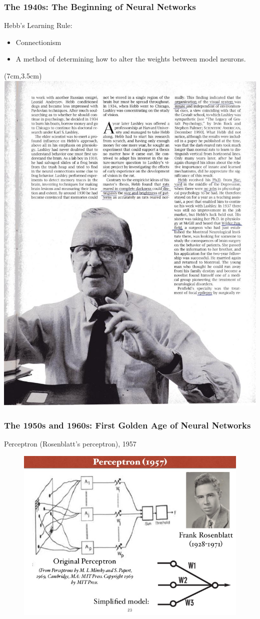 \documentclass{beamer}
\begin{document}
\begin{frame}
	\frametitle{The 1940s: The Beginning of Neural Networks}
	Hebb’s Learning Rule:
	\begin{itemize}
		\item  Connectionism
		\item  A method of determining how to alter the weights between model neurons.
	\end{itemize}
	\vspace{2in}
	\begin{textblock*}{0.65\linewidth}(7cm,3.5cm) %
		\includegraphics[width=0.65\linewidth]{image315}
	\end{textblock*}

\end{frame}


\begin{frame}
	\frametitle{The 1950s and 1960s: First Golden Age of Neural Networks}
	Perceptron (Rosenblatt’s perceptron), 1957
\begin{figure}
	\includegraphics[width=0.75\linewidth]{perceptron-2}
\end{figure}
\end{frame}
\end{document}
